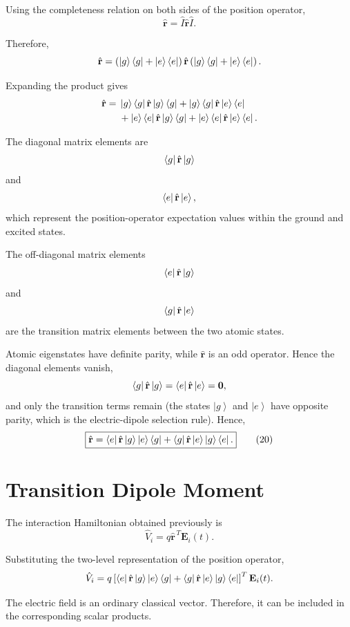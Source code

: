 \documentclass[12pt,a4paper]{article}
\newcommand{\ketg}{\left|g\right\rangle}
\newcommand{\kete}{\left|e\right\rangle}
\begin{document}
Using the completeness relation on both sides of the position
operator,
\[
\hat{\mathbf r}
=
\hat I\hat{\mathbf r}\hat I.
\]

Therefore,
\[
\hat{\mathbf r}
=
\left(
\ketg\bra g+\kete\bra e
\right)
\hat{\mathbf r}
\left(
\ketg\bra g+\kete\bra e
\right).
\]

Expanding the product gives
\[
\begin{aligned}
\hat{\mathbf r}
={}&
\ketg\bra g
\hat{\mathbf r}
\ketg\bra g
+
\ketg\bra g
\hat{\mathbf r}
\kete\bra e\\
&+
\kete\bra e
\hat{\mathbf r}
\ketg\bra g
+
\kete\bra e
\hat{\mathbf r}
\kete\bra e.
\end{aligned}
\]

The diagonal matrix elements are
\[
\bra g\hat{\mathbf r}\ketg
\]
and
\[
\bra e\hat{\mathbf r}\kete,
\]
which represent the position-operator expectation values within
the ground and excited states.

The off-diagonal matrix elements
\[
\bra e\hat{\mathbf r}\ketg
\]
and
\[
\bra g\hat{\mathbf r}\kete
\]
are the transition matrix elements between the two atomic states.

Atomic eigenstates have definite parity, while $\hat{\mathbf r}$ is an
odd operator. Hence the diagonal elements vanish,
\[
\bra g\hat{\mathbf r}\ketg
=
\bra e\hat{\mathbf r}\kete
=
\mathbf 0,
\]
and only the transition terms remain (the states $\ketg$ and $\kete$
have opposite parity, which is the electric-dipole selection rule).
Hence,
\begin{equation}
\boxed{
\hat{\mathbf r}
=
\bra e\hat{\mathbf r}\ketg
\kete\bra g
+
\bra g\hat{\mathbf r}\kete
\ketg\bra e.
}
\tag{20}
\end{equation}

\section{Transition Dipole Moment}

The interaction Hamiltonian obtained previously is
\[
\hat V_i
=
q\hat{\mathbf r}^{\,T}\mathbf E_i(t).
\]

Substituting the two-level representation of the position operator,
\[
\hat V_i
=
q
\left[
\bra e\hat{\mathbf r}\ketg
\kete\bra g
+
\bra g\hat{\mathbf r}\kete
\ketg\bra e
\right]^{T}
\mathbf E_i(t).
\]

The electric field is an ordinary classical vector. Therefore, it
can be included in the corresponding scalar products.
\end{document}

